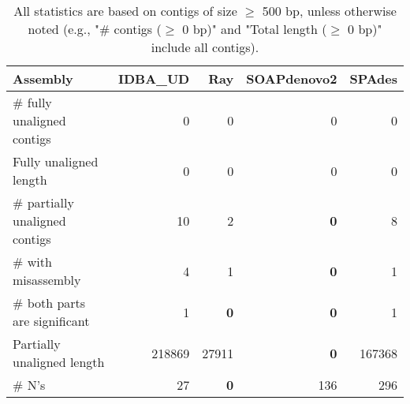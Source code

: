 \documentclass[12pt,a4paper]{article}
\begin{document}
\begin{table}[ht]
\begin{center}
\caption{All statistics are based on contigs of size $\geq$ 500 bp, unless otherwise noted (e.g., "\# contigs ($\geq$ 0 bp)" and "Total length ($\geq$ 0 bp)" include all contigs).}
\begin{tabular}{|l*{4}{|r}|}
\hline
Assembly & IDBA\_UD & Ray & SOAPdenovo2 & SPAdes \\ \hline
\# fully unaligned contigs & 0 & 0 & 0 & 0 \\ \hline
Fully unaligned length & 0 & 0 & 0 & 0 \\ \hline
\# partially unaligned contigs & 10 & 2 & {\bf 0} & 8 \\ \hline
\hspace{5mm}\# with misassembly & 4 & 1 & {\bf 0} & 1 \\ \hline
\hspace{5mm}\# both parts are significant & 1 & {\bf 0} & {\bf 0} & 1 \\ \hline
Partially unaligned length & 218869 & 27911 & {\bf 0} & 167368 \\ \hline
\# N's & 27 & {\bf 0} & 136 & 296 \\ \hline
\end{tabular}
\end{center}
\end{table}
\end{document}
